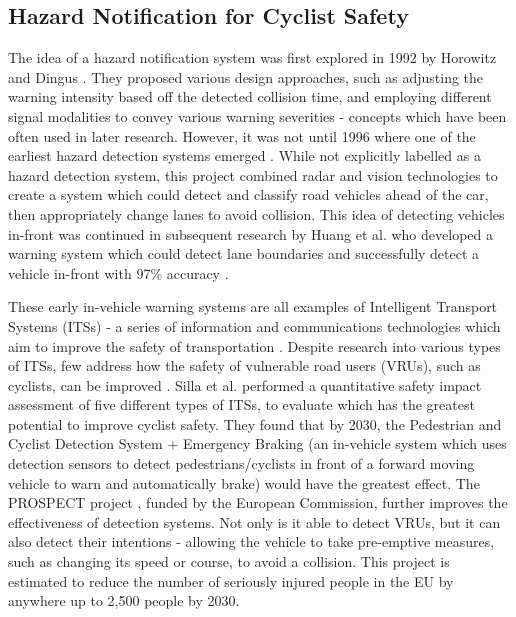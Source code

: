 \documentclass{interim}
\begin{document}
\subsection{Hazard Notification for Cyclist Safety}
The idea of a hazard notification system was first explored in 1992 by Horowitz and Dingus \cite{doi:10.1177/154193129203601320}. They proposed various design approaches, such as adjusting the warning intensity based off the detected collision time, and employing different signal modalities to convey various warning severities - concepts which have been often used in later research. However, it was not until 1996 where one of the earliest hazard detection systems emerged \cite{566402}. While not explicitly labelled as a hazard detection system, this project combined radar and vision technologies to create a system which could detect and classify road vehicles ahead of the car, then appropriately change lanes to avoid collision. This idea of detecting vehicles in-front was continued in subsequent research by Huang et al. who developed a warning system which could detect lane boundaries and successfully detect a vehicle in-front with 97\% accuracy \cite{1307429}.

These early in-vehicle warning systems are all examples of Intelligent Transport Systems (ITSs) - a series of information and communications technologies which aim to improve the safety of transportation \cite{its}. Despite research into various types of ITSs, few address how the safety of vulnerable road users (VRUs), such as cyclists, can be improved \cite{Scholliers2017}. Silla et al. \cite{SILLA2017134} performed a quantitative safety impact assessment of five different types of ITSs, to evaluate which has the greatest potential to improve cyclist safety. They found that by 2030, the Pedestrian and Cyclist Detection System + Emergency Braking (an in-vehicle system which uses detection sensors to detect pedestrians/cyclists in front of a forward moving vehicle to warn and automatically brake) would have the greatest effect. The PROSPECT project \cite{cieslik2019improving}, funded by the European Commission, further improves the effectiveness of detection systems. Not only is it able to detect VRUs, but it can also detect their intentions - allowing the vehicle to take pre-emptive measures, such as changing its speed or course, to avoid a collision. This project is estimated to reduce the number of seriously injured people in the EU by anywhere up to 2,500 people by 2030.
\end{document}
